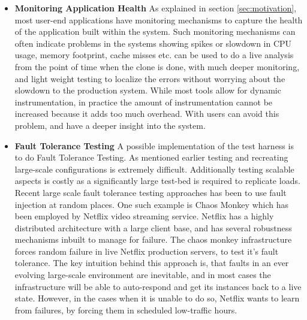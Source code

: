 \begin{itemize}
  \item \textbf{Monitoring Application Health}
As explained in section \ref{sec:motivation}, most user-end applications have monitoring mechanisms to capture the health of the application built within the system.
Such monitoring mechanisms can often indicate problems in the systems showing spikes or slowdown in CPU usage, memory footprint, cache misses etc.
\parikshan can be used to do a live analysis from the point of time when the clone is done, with much deeper monitoring, and light weight testing to localize the errors without worrying about the slowdown to the production system.
While most tools allow for dynamic instrumentation, in practice the amount of instrumentation cannot be increased because it adds too much overhead.
With \parikshan users can avoid this problem, and have a deeper insight into the system.

\item \textbf{Fault Tolerance Testing}
    A possible implementation of the \parikshan test harness is to do Fault Tolerance Testing.
As mentioned earlier testing and recreating large-scale configurations is extremely difficult.
Additionally testing scalable aspects is costly as a significantly large test-bed is required to replicate loads. 
Recent large scale fault tolerance testing approaches has been to use fault injection at random places.
One such example is Chaos Monkey\cite{chaosmonkey} which has been employed by Netflix \cite{netflix} video streaming service. 
Netflix has a highly distributed architecture with a large client base, and has several robustness mechanisms inbuilt to manage for failure. 
The chaos monkey infrastructure forces random failure in live Netflix production servers, to test it's fault tolerance.
The key intuition behind this approach is, that faults in an ever evolving large-scale environment are inevitable, and in most cases the infrastructure will be able to auto-respond and get its instances back to a live state. 
However, in the cases when it is unable to do so, Netflix wants to learn from failures, by forcing them in scheduled low-traffic hours.


\end{itemize}
